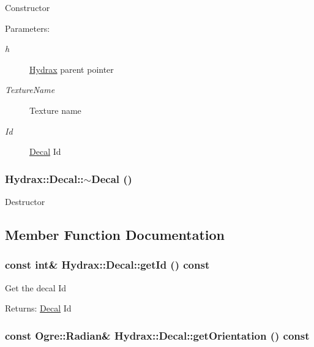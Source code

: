 Constructor \begin{Desc}
\item[Parameters:]
\begin{description}
\item[{\em h}]\hyperlink{class_hydrax_1_1_hydrax}{Hydrax} parent pointer \item[{\em TextureName}]Texture name \item[{\em Id}]\hyperlink{class_hydrax_1_1_decal}{Decal} Id \end{description}
\end{Desc}
\hypertarget{class_hydrax_1_1_decal_aad4588738304d06a93271d28f2afcdc}{
\subsubsection[{$\sim$Decal}]{\setlength{\rightskip}{0pt plus 5cm}Hydrax::Decal::$\sim$Decal ()}}
\label{class_hydrax_1_1_decal_aad4588738304d06a93271d28f2afcdc}


Destructor 

\subsection{Member Function Documentation}
\hypertarget{class_hydrax_1_1_decal_616f8a17b1e140b68bc4fda390c4bbf6}{
\subsubsection[{getId}]{\setlength{\rightskip}{0pt plus 5cm}const int\& Hydrax::Decal::getId () const}}
\label{class_hydrax_1_1_decal_616f8a17b1e140b68bc4fda390c4bbf6}


Get the decal Id \begin{Desc}
\item[Returns:]\hyperlink{class_hydrax_1_1_decal}{Decal} Id \end{Desc}
\hypertarget{class_hydrax_1_1_decal_81f991775c4fb8d026d7c8d4b2f0ef7d}{
\subsubsection[{getOrientation}]{\setlength{\rightskip}{0pt plus 5cm}const Ogre::Radian\& Hydrax::Decal::getOrientation () const}}
\label{class_hydrax_1_1_decal_81f991775c4fb8d026d7c8d4b2f0ef7d}


